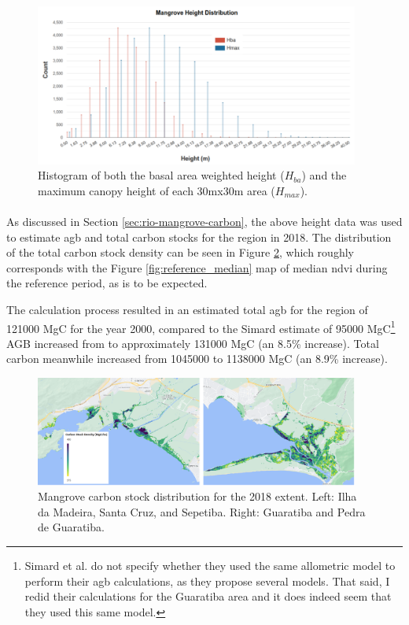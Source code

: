 \begin{figure}[H] 
\centering
\includegraphics[width=0.95\textwidth]{Figures/chap4/height_histogram.png}
\caption[Histogram of Mangrove Height in Region]{Histogram of both the basal area weighted height ($H_{ba}$) and the maximum canopy height of each 30mx30m area ($H_{max}$).}
\label{fig:height_histogram}
\end{figure}

\paragraph{} \leavevmode\newline

As discussed in Section \ref{sec:rio-mangrove-carbon}, the above height data was used to estimate \ac{agb} and total carbon stocks for the region in 2018. The distribution of the total carbon stock density can be seen in Figure \ref{fig:carbon_density}, which roughly corresponds with the Figure \ref{fig:reference_median} map of median \ac{ndvi} during the reference period, as is to be expected. 

The calculation process resulted in an estimated total \ac{agb} for the region of 121000 MgC for the year 2000, compared to the Simard estimate of 95000 MgC\footnote{Simard et al. do not specify whether they used the same allometric model to perform their \ac{agb} calculations, as they propose several models. That said, I redid their calculations for the Guaratiba area and it does indeed seem that they used this same model.} AGB increased from to approximately 131000 MgC (an 8.5\% increase). Total carbon meanwhile increased from 1045000 to 1138000 MgC (an 8.9\% increase).

\begin{figure}[H] 
\centering
\includegraphics[width=0.95\textwidth]{Figures/chap4/carbon_density.png}
\caption[Mangrove Carbon Stock Distribution]{Mangrove carbon stock distribution for the 2018 extent. Left: Ilha da Madeira, Santa Cruz, and Sepetiba. Right: Guaratiba and Pedra de Guaratiba.}
\label{fig:carbon_density}
\end{figure}

